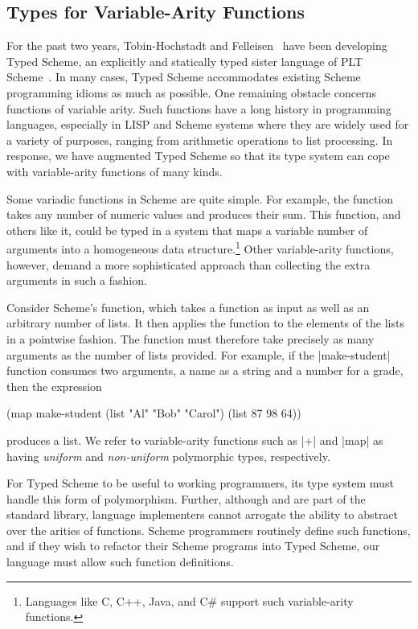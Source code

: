 \begin{schemeregion}

\section{Types for Variable-Arity Functions}
\label{sec:intro}

For the past two years, Tobin-Hochstadt and Felleisen~\cite{thf:dls06,thf:popl08} have been
 developing Typed Scheme, an explicitly and statically typed sister
 language of PLT Scheme~\cite{mf:mzscheme}. In many cases, Typed Scheme
 accommodates existing Scheme programming idioms as much as possible.  One
 remaining obstacle concerns functions of variable arity. Such functions
 have a long history in programming languages, especially in LISP and
 Scheme systems where they are widely used for a variety of purposes,
 ranging from arithmetic operations to list processing. In response, we have
 augmented Typed Scheme so that its type system can cope
 with variable-arity functions of many kinds.

Some variadic functions in Scheme are quite simple. For example, the
 function \scheme{+} takes any number of numeric values and produces their
 sum.  This function, and others like it, could be typed in a system that
 maps a variable number of arguments into a homogeneous data
 structure.\footnote{Languages like C, C++, Java, and C\# support
 such variable-arity functions.} Other variable-arity functions,
 however, demand a more sophisticated approach than collecting
 the extra arguments in such a fashion.

Consider Scheme's  function, which takes a function as input as well
 as an arbitrary number of lists.  It then applies the function to the
 elements of the lists in a pointwise fashion.  The function must therefore
 take precisely as many arguments as the number of lists provided.  For
 example, if the \scheme|make-student| function consumes two arguments, a name as a string and
 a number for a grade, then the expression
\begin{schemedisplay}
(map make-student (list "Al" "Bob" "Carol") (list 87 98 64))
\end{schemedisplay} 
 produces a list.  We refer to variable-arity functions such as
 \scheme|+| and \scheme|map| as having \emph{uniform} and
 \emph{non-uniform} polymorphic types, respectively.

For Typed Scheme to be useful to working programmers, its type system must
 handle this form of polymorphism.  Further, although  and \scheme{+}
 are part of the standard library, language implementers cannot arrogate
 the ability to abstract over the arities of functions. Scheme programmers
 routinely define such functions, and if they wish to refactor their
 Scheme programs into Typed Scheme, our language must allow such
 function definitions. 


\end{schemeregion}
